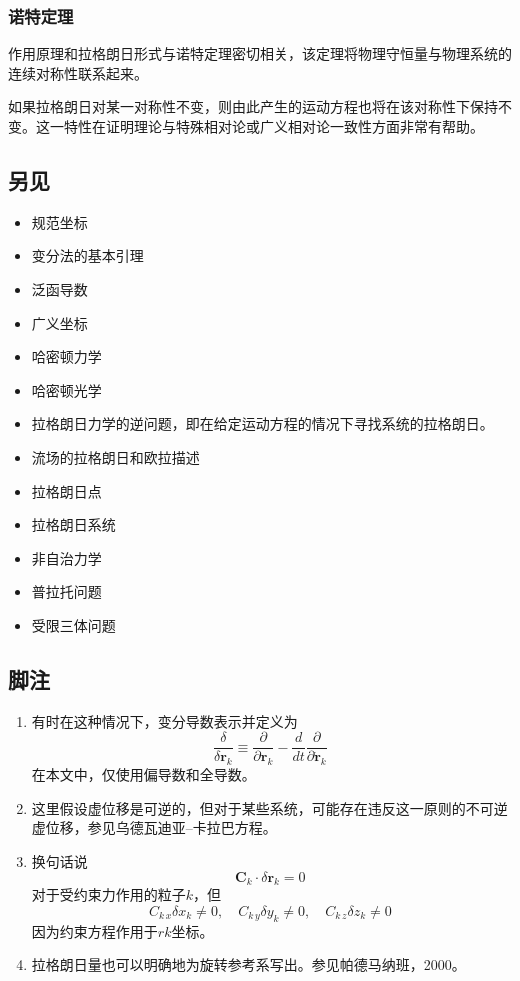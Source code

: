 \subsubsection{诺特定理}
作用原理和拉格朗日形式与诺特定理密切相关，该定理将物理守恒量与物理系统的连续对称性联系起来。

如果拉格朗日对某一对称性不变，则由此产生的运动方程也将在该对称性下保持不变。这一特性在证明理论与特殊相对论或广义相对论一致性方面非常有帮助。
\subsection{另见}

\begin{itemize}
\item 规范坐标
\item 变分法的基本引理
\item 泛函导数
\item 广义坐标
\item 哈密顿力学
\item 哈密顿光学
\item 拉格朗日力学的逆问题，即在给定运动方程的情况下寻找系统的拉格朗日。
\item 流场的拉格朗日和欧拉描述
\item 拉格朗日点
\item 拉格朗日系统
\item 非自治力学
\item 普拉托问题
\item 受限三体问题
\end{itemize}
\subsection{脚注}  
\begin{enumerate}
\item 有时在这种情况下，变分导数表示并定义为
\[
\frac{\delta}{\delta \mathbf{r}_k} \equiv \frac{\partial}{\partial \mathbf{r}_k} - \frac{d}{dt} \frac{\partial}{\partial \dot{\mathbf{r}}_k}~
\]
在本文中，仅使用偏导数和全导数。  
\item 这里假设虚位移是可逆的，但对于某些系统，可能存在违反这一原则的不可逆虚位移，参见乌德瓦迪亚–卡拉巴方程。  
\item 换句话说  
\[
\mathbf {C} _{k}\cdot \delta \mathbf {r} _{k}=0~
\]  
对于受约束力作用的粒子\(k\)，但  
\[
C_{k\,x}\delta x_{k}\neq 0,\quad C_{k\,y}\delta y_{k}\neq 0,\quad C_{k\,z}\delta z_{k}\neq 0~
\]  
因为约束方程作用于\(rk\)坐标。  
\item 拉格朗日量也可以明确地为旋转参考系写出。参见帕德马纳班，2000。
\end{enumerate}
